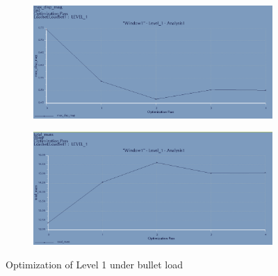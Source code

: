 \documentclass[12pt,letterpaper]{report}
\begin{document}
		\begin{figure}[H]
			\centering
			\begin{subfigure}{.45\textwidth}
				\includegraphics[width=\textwidth]{L1BulletOptimDispGraph}
				\label{fig:L1BulletOptimDispGraph}
			\end{subfigure}
			\begin{subfigure}{.45\textwidth}
				\includegraphics[width=\textwidth]{L1BulletOptimMassGraph}
				\label{fig:L1BulletOptimMassGraph}
			\end{subfigure}
			\caption{Optimization of Level 1 under bullet load}
		\end{figure}
		
\end{document}
